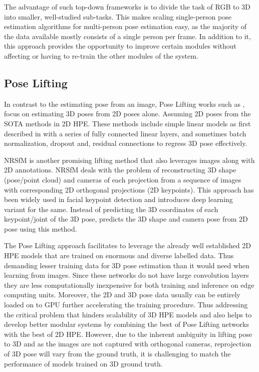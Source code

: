 The advantage of such top-down frameworks is to divide the task of RGB to 3D into smaller, well-studied sub-tasks. This makes scaling single-person pose estimation algorithms for multi-person pose estimation easy, as the majority of the data available mostly consists of a single person per frame. In addition to it, this approach provides the opportunity to improve certain modules without affecting or having to re-train the other modules of the system.

\subsection{Pose Lifting}

In contrast to the estimating pose from an image, Pose Lifting works such as \cite{poselifter,  amazon1, repnet, c3dpo, unsupervisedAdversarial}, focus on estimating 3D poses from 2D poses alone. Assuming 2D poses from the \ac{SOTA} methods in 2D \ac{HPE}. These methods include simple linear models as first described in \cite{MartinezHRL17} with a series of fully connected linear layers, and sometimes batch normalization, dropout and, residual connections to regress 3D pose effectively.

\ac{NRSfM} is another promising lifting method that also leverages images along with 2D annotations. \ac{NRSfM} deals with the problem of reconstructing 3D shape (pose/point cloud) and cameras of each projection from a sequence of images with corresponding 2D orthogonal projections (2D keypoints). This approach has been widely used in facial keypoint detection and \cite{deepNRSFM} introduces deep learning variant for the same. Instead of predicting the 3D coordinates of each keypoint/joint of the 3D pose, \cite{DistillNRSfM, c3dpo, deepNRSFM, nrsfm++} predicts the 3D shape and camera pose from 2D pose using this method.

The Pose Lifting approach facilitates to leverage the already well established 2D \ac{HPE} models that are trained on enormous and diverse labelled data. Thus demanding lesser training data for 3D pose estimation than it would need when learning from images. Since these networks do not have large convolution layers they are less computationally inexpensive for both training and inference on edge computing units. Moreover, the 2D and 3D pose data usually can be entirely loaded on to GPU further accelerating the training procedure. Thus addressing the critical problem that hinders scalability of 3D \ac{HPE} models and also helps to develop better modular systems by combining the best of Pose Lifting networks with the best of 2D \ac{HPE}. However, due to the inherent ambiguity in lifting pose to 3D and as the images are not captured with orthogonal cameras, reprojection of 3D pose will vary from the ground truth, it is challenging to match the performance of models trained on 3D ground truth.

